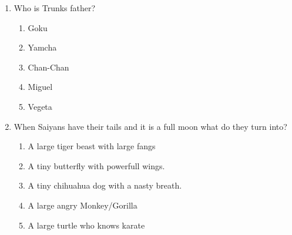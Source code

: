 \documentclass[letterpaper,addpoints,answers,twocolumn,10pt]{exam}
\begin{document}
\begin{enumerate}[leftmargin=.2in]
\begin{enumerate}[noitemsep,leftmargin=0in]
\end{enumerate}



\item  Who is Trunks father?


\begin{enumerate}[noitemsep,leftmargin=0in]


\item  Goku
\item  Yamcha
\item  Chan-Chan
\item  Miguel
\item  Vegeta


\end{enumerate}



\item  When Saiyans have their tails and it is a full moon what do they turn into?


\begin{enumerate}[noitemsep,leftmargin=0in]


\item  A large tiger beast with large fangs
\item  A tiny butterfly with powerfull wings.
\item  A tiny chihuahua dog with a nasty breath.
\item  A large angry Monkey/Gorilla
\item  A large turtle who knows karate


\end{enumerate}



\end{enumerate}
\end{document}
